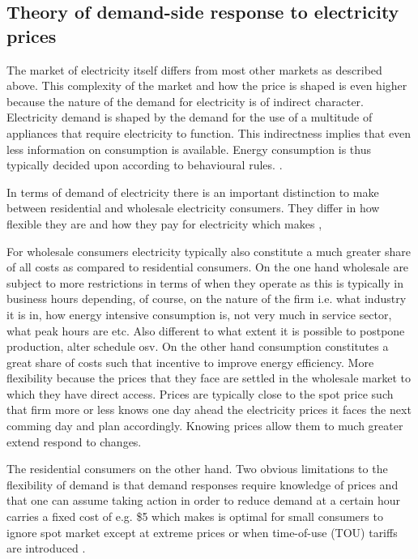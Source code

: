 \subsection{Theory of demand-side response to electricity prices}
\label{subsec:t_demand}
The market of electricity itself differs from most other markets as described above. This complexity of the market and how the price is shaped is even higher because the nature of the demand for electricity is of indirect character. Electricity demand is shaped by the demand for the use of a multitude of appliances that require electricity to function. This indirectness implies that even less information on consumption is available. Energy consumption is thus typically decided upon according to behavioural rules. \citep{kirschen2003demand}. 

In terms of demand of electricity there is an important distinction to make between residential and wholesale electricity consumers. They differ in how flexible they are and how they pay for electricity which makes , 

For wholesale consumers electricity typically also constitute a much greater share of all costs as compared to residential consumers. 
On the one hand wholesale are subject to more restrictions in terms of when they operate as this is typically in business hours depending, of course, on the nature of the firm i.e. what industry it is in, how energy intensive consumption is, not very much in service sector, what peak hours are etc. Also different to what extent it is possible to postpone production, alter schedule osv. On the other hand consumption constitutes a great share of costs such that incentive to improve energy efficiency. More flexibility because the prices that they face are settled in the wholesale market to which they have direct access. Prices are typically close to the spot price such that firm more or less knows one day ahead the electricity prices it faces the next comming day and plan accordingly. Knowing prices allow them to much greater extend respond to changes. 

The residential consumers on the other hand. 
Two obvious limitations to the flexibility of demand is that demand responses require knowledge of prices and that one can assume taking action in order to reduce demand at a certain hour carries a fixed cost of e.g. \$5 which makes is optimal for small consumers to ignore spot market except at extreme prices or when time-of-use (TOU) tariffs are introduced \citep{wolak2011residential}. 

